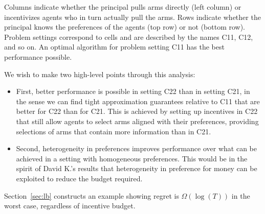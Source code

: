 Columns indicate whether the principal pulls arms directly (left column) or incentivizes agents who in turn actually pull the arms. Rows indicate whether the principal knows the preferences of the agents (top row) or not (bottom row).   Problem settings correspond to cells and are described by the names C11, C12, and so on. An optimal algorithm for problem setting C11 has the best performance possible.

We wish to make two high-level points through this analysis:

\begin{itemize}
\item First, better performance is possible in setting C22 than in setting C21, in the sense we can find tight approximation guarantees relative to C11 that are better for C22 than for C21.  This is achieved by setting up incentives in C22 that still allow agents to select arms aligned with their preferences, providing selections of arms that contain more information than in C21.
\item Second, heterogeneity in preferences improves performance over what can be achieved in a setting with homogeneous preferences.  This would be in the spirit of David K.'s results that heterogeneity in preference for money can be exploited to reduce the budget required.
\end{itemize}



Section~\ref{sec:lb} constructs an example showing regret is $\Omega(\log(T))$ in the worst case, regardless of incentive budget.

